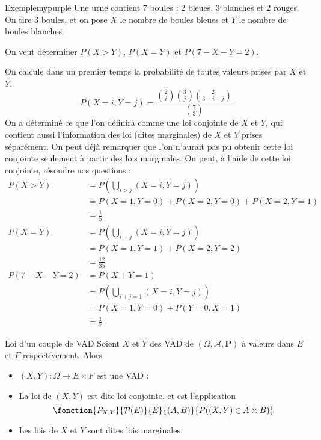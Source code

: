     \begin{omed}{Exemple}{mypurple}
        Une urne contient $7$ boules : $2$ bleues, 3 blanches et 2 rouges. On tire 3 boules, et on pose $X$ le nombre de boules bleues et $Y$ le nombre de boules blanches. 

        On veut déterminer $P(X > Y)$, $P(X = Y)$ et $P(7 - X - Y = 2)$.

        On calcule dans un premier temps la probabilité de toutes valeurs prises par $X$ et $Y$.
        \[ P(X = i, Y = j) = \frac{\binom{2}{i} \binom{3}{j} \binom{2}{3 - i - j}}{\binom{7}{3}}  \]
        On a déterminé ce que l’on définira comme une loi conjointe de $X$ et $Y$, qui contient aussi l’information des loi (dites marginales) de $X$ et $Y$ prises séparément. On peut déjà remarquer que l’on n’aurait pas pu obtenir cette loi conjointe seulement à partir des lois marginales. On peut, à l’aide de cette loi conjointe, résoudre nos questions :
        \begin{align*}
            P(X > Y) &= P\left(\bigcup_{i > j} (X=i, Y = j)\right) \\
            &= P(X=1, Y=0) + P(X = 2, Y = 0) + P(X = 2, Y = 1) \\
            &= \frac{1}{5} \\
            P(X = Y) &= P\left(\bigcup_{i = j} (X = i, Y = j)\right) \\
            &= P(X=1, Y=1) + P(X=2,Y=2) \\
            &= \frac{12}{35} \\
            P(7 - X - Y = 2) &= P(X + Y = 1) \\
            &= P\left(\bigcup_{i + j = 1} (X=i,Y=j)\right) \\
            &= P(X=1, Y=0) + P(Y=0,X=1) \\
            &= \frac{1}{7}
        \end{align*}
    \end{omed}

    \begin{defitheo}{Loi d’un couple de VAD}{}
        Soient $X$ et $Y$ des VAD de $(\Omega, \mathcal{A}, \mathbf{P})$ à valeurs dans $E$ et $F$ respectivement. Alors 
        \begin{itemize}
            \item $(X,Y) : \Omega \to E \times F$ est une VAD ;
            \item La loi de $(X,Y)$ est dite loi conjointe, et est l’application  
            \[ \fonction{P_{X,Y}}{\mathcal{P}(E)}{E}{(A,B)}{P((X,Y) \in A \times B)} \]
            \item Les lois de $X$ et $Y$ sont dites lois marginales.
        \end{itemize}
    \end{defitheo}

